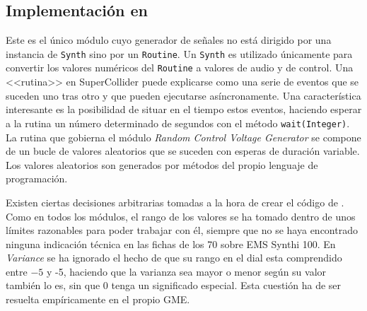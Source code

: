 \subsection{Implementación en \appName}
Este es el único módulo cuyo generador de señales no está dirigido por una instancia de \texttt{Synth} sino por un \texttt{Routine}. Un \texttt{Synth} es utilizado únicamente para convertir los valores numéricos del \texttt{Routine} a valores de audio y de control. Una <<rutina>> en SuperCollider puede explicarse como una serie de eventos que se suceden uno tras otro y que pueden ejecutarse asíncronamente. Una característica interesante es la posibilidad de situar en el tiempo estos eventos, haciendo esperar a la rutina un número determinado de segundos con el método \texttt{wait(Integer)}. La rutina que gobierna el módulo \textit{Random Control Voltage Generator} se compone de un bucle de valores aleatorios que se suceden con esperas de duración variable. Los valores aleatorios son generados por métodos del propio lenguaje de programación.

Existen ciertas decisiones arbitrarias tomadas a la hora de crear el código de \appName. Como en todos los módulos, el rango de los valores se ha tomado dentro de unos límites razonables para poder trabajar con él, siempre que no se haya encontrado ninguna indicación técnica en las fichas de los 70 sobre EMS Synthi 100. En \textit{Variance} se ha ignorado el hecho de que su rango en el dial esta comprendido entre $-5$ y -5, haciendo que la varianza sea mayor o menor según su valor también lo es, sin que 0 tenga un significado especial. Esta cuestión ha de ser resuelta empíricamente en el propio GME.